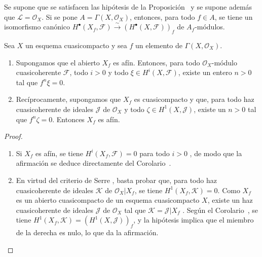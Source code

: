 \begin{corollary}[1.4.6]
\label{III.1.4.6}
\label{III.1.4.6-fr}
Se supone que se satisfacen las hipótesis de la Proposición~\textup{} y se supone además que $\mathcal L=\mathcal O_X$.
Si se pone $A=\Gamma(X,\mathcal O_X)$, entonces, para todo $f\in A$, se tiene un isomorfismo canónico $H^\bullet(X_f,\mathcal F)
\xrightarrow{\sim}(H^\bullet(X,\mathcal F))_f$ de $A_f$-módulos.
\end{corollary}

\begin{corollary}[1.4.7]
\label{III.1.4.7}
\label{III.1.4.7-fr}
Sea $X$ un esquema cuasicompacto y sea $f$ un elemento de $\Gamma(X,\mathcal O_X)$.
\begin{enumerate}
  \item[{\rm(i)}] Supongamos que el abierto $X_f$ es afín.
    Entonces, para todo $\mathcal O_X$-módulo cuasicoherente $\mathcal F$, todo $i>0$ y todo $\xi\in H^i(X,\mathcal F)$, existe un entero $n>0$ tal que $f^n\xi=0$.
  \item[{\rm(ii)}] Recíprocamente, supongamos que $X_f$ es cuasicompacto y que, para todo haz cuasicoherente de ideales $\mathcal J$ de $\mathcal O_X$ y todo $\zeta\in H^1(X,\mathcal J)$, existe un $n>0$ tal que $f^n\zeta=0$.
    Entonces $X_f$ es afín.
\end{enumerate}
\end{corollary}

\begin{proof}
\medskip\noindent
\begin{enumerate}
  \item[(i)] Si $X_f$ es afín, se tiene $H^i(X_f,\mathcal F)=0$ para todo $i>0$ , de modo que la afirmación se deduce directamente del Corolario~.
  \item[(ii)] En virtud del criterio de Serre , basta probar que, para todo haz cuasicoherente de ideales $\mathcal K$ de $\mathcal O_X\vert X_f$, se tiene $H^1(X_f,\mathcal K)=0$.
    Como $X_f$ es un abierto cuasicompacto de un esquema cuasicompacto $X$, existe un haz cuasicoherente de ideales $\mathcal J$ de $\mathcal O_X$ tal que $\mathcal K=\mathcal J\vert X_f$ .
    Según el Corolario~, se tiene $H^1(X_f,\mathcal K)=(H^1(X,\mathcal J))_f$, y la hipótesis implica que el miembro de la derecha es nulo, lo que da la afirmación.
\end{enumerate}
\end{proof}


